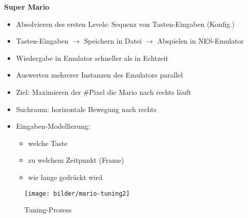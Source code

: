 \begin{frame}
  \textbf{Super Mario}
   
   \begin{itemize}
   
    \item Absolvieren des ersten Levels: Sequenz von Tasten-Eingaben (Konfig.)
    
    
    \item Tasten-Eingaben $\rightarrow$ Speichern in Datei $\rightarrow$ Abspielen in NES-Emulator
    
    \item Wiedergabe in Emulator schneller als in Echtzeit
    \item Auswerten mehrerer Instanzen des Emulators parallel
    
    \text{}
    
    \item Ziel: Maximieren der \#Pixel die Mario nach rechts läuft
    
    \item Suchraum: horizontale Bewegung nach rechts
    
    \item Eingaben-Modellierung:
      \begin{itemize}
        \item welche Taste
        \item zu welchem Zeitpunkt (Frame)
        \item wie lange gedrückt wird
      \end{itemize}
    \end{itemize}
   \end{frame}
\endgroup

 \begingroup
  \begin{frame}
  
  \begin{figure}
    \centering\texttt{[image: bilder/mario-tuning2]}
    \caption{Tuning-Prozess}
  \end{figure} 
  \end{frame}
  \endgroup
  
